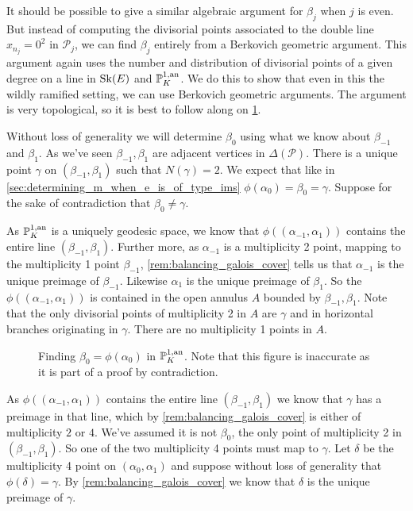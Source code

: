 It should be possible to give a similar algebraic argument for $\beta_{j}$ when $j$ is even.
But instead of computing the divisorial points associated to the double line $x_{n_j} = 0^2$ in $\mathcal{P} _j$, we can find $\beta_j$ entirely from a Berkovich geometric argument. 
This argument again uses the number and distribution of divisorial points of a given degree on a line in $\operatorname{Sk}(E)$ and $\mathbb{P}^{1, \text{an}}_K$.
We do this to show that even in this the wildly ramified setting, we can use Berkovich geometric arguments. 
The argument is very topological, so it is best to follow along on \cref{fig:argument_ims_wild}.

\medskip

Without loss of generality we will determine $\beta_0$ using what we know about $\beta_{-1}$ and $\beta_1$. 
As we've seen $\beta_{-1}, \beta_{1}$ are adjacent vertices in $\Delta(\mathscr P)$. 
There is a unique point $\gamma$ on $(\beta_{-1}, \beta_1)$ such that $N(\gamma) = 2$.  
We expect that like in \cref{sec:determining_m_when_e_is_of_type_ims} $\phi(\alpha_0) = \beta_0 = \gamma$. 
Suppose for the sake of contradiction that $\beta_0 \ne \gamma$.



As $\mathbb{P}^{1, \text{an}}_K$ is a uniquely geodesic space, we know that $\phi((\alpha_{-1}, \alpha_{1}))$ contains the entire line  $(\beta_{-1}, \beta_1)$. 
Further more, as $\alpha_{-1}$ is a multiplicity 2 point, mapping to the multiplicity 1 point $\beta_{-1}$, \cref{rem:balancing_galois_cover} tells us that $\alpha_{-1}$ is the unique preimage of $\beta_{-1}$. 
Likewise $\alpha_1$ is the unique preimage of $\beta_1$. 
So the $\phi((\alpha_{-1}, \alpha_{1}))$ is contained in the open annulus $A$ bounded by $\beta_{-1}, \beta_1$.
Note that the only divisorial points of multiplicity 2 in $A$ are $\gamma$ and in horizontal branches originating in $\gamma$. There are no multiplicity 1 points in  $A$. 
\begin{figure}[ht]
    \centering
    \caption{Finding $\beta_0 = \phi(\alpha_0)$ in $\mathbb{P}^{1,\text{an}}_{K}$. 
    Note that this figure is inaccurate as it is part of a proof by contradiction.}
    \label{fig:argument_ims_wild}
\end{figure}
As $\phi((\alpha_{-1}, \alpha_{1}))$ contains the entire line $(\beta_{-1}, \beta_1)$ we know that $\gamma$ has a preimage in that line, which by \cref{rem:balancing_galois_cover} is either of multiplicity $2$ or $4$. 
We've assumed it is not $\beta_0$, the only point of multiplicity 2 in  $(\beta_{-1}, \beta_1)$.
So one of the two multiplicity 4 points must map to $\gamma$. 
Let $\delta$ be the multiplicity 4 point on $(\alpha_0, \alpha_1)$ and suppose without loss of generality that $\phi(\delta) = \gamma$. 
By \cref{rem:balancing_galois_cover} we know that $\delta$ is the unique preimage of $\gamma$. 

